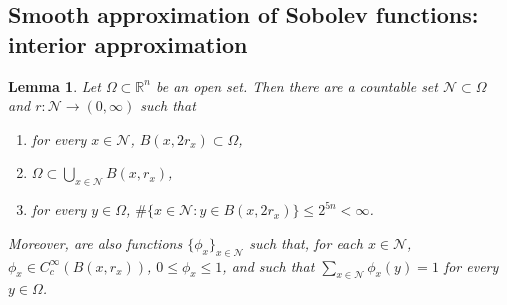 \documentclass[a4paper,9pt]{amsart}
\newcommand{\scr}[1]{\mathscr{#1}}
\newcommand{\N}{\mathbb{N}}	%
\newcommand{\R}{\mathbb{R}}	%
\theoremstyle{plain}
\newtheorem{lemma}[proposition]{Lemma}
\theoremstyle{definition}
\theoremstyle{remark}
\begin{document}
\subsection{Smooth approximation of Sobolev functions: interior approximation}

\begin{lemma}\label{lem680f3acc}
	Let $\Omega\subset\R^n$ be an open set.
	Then there are a countable set $\scr N\subset\Omega$ and $r:\scr N\to(0,\infty)$ such that
	\begin{enumerate}[label=(\ref{lem680f3acc}.\alph*)]
	\item\label{lem680f3acc_1}
	for every $x\in\scr N$, $B(x,2r_x)\subset \Omega$,
	\item\label{lem680f3acc_2}
	$\Omega\subset\bigcup_{x\in\scr N} B(x,r_x)$,
	\item\label{lem680f3acc_3} 
	for every $y\in\Omega$, $\# \{x\in\scr N: y\in B(x,2r_x) \} \le 2^{5n} < \infty$.
	\end{enumerate}
	
	Moreover, are also functions $\{\phi_x\}_{x\in\scr N}$ such that, for each $x\in\scr N$, $\phi_x\in C^\infty_c(B(x,r_x))$, $0\le \phi_x\le 1$,
	and such that $\sum_{x\in\scr N}\phi_x(y) = 1$ for every $y\in \Omega$.
\end{lemma}
\end{document}
